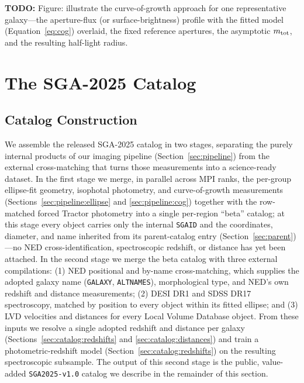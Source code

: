 \documentclass[modern,linenumbers]{aastex701}
\newcommand{\todo}[1]{{\color{red}\textbf{TODO:} #1}}
\begin{document}
\todo{Figure: illustrate the curve-of-growth approach for one
  representative galaxy---the aperture-flux (or surface-brightness)
  profile with the fitted model (Equation~\ref{eq:cog}) overlaid, the
  fixed reference apertures, the asymptotic $m_{\rm tot}$, and the
  resulting half-light radius.}

\section{The SGA-2025 Catalog}
\label{sec:catalog}

\subsection{Catalog Construction}
\label{sec:catalog:construction}

We assemble the released SGA-2025 catalog in two stages, separating the
purely internal products of our imaging pipeline (Section~\ref{sec:pipeline})
from the external cross-matching that turns those measurements into a
science-ready dataset. In the first stage we merge, in parallel across MPI
ranks, the per-group ellipse-fit geometry, isophotal photometry, and
curve-of-growth measurements (Sections~\ref{sec:pipeline:ellipse} and
\ref{sec:pipeline:cog}) together with the row-matched forced Tractor
photometry into a single per-region ``beta'' catalog; at this stage every
object carries only the internal \texttt{SGAID} and the coordinates,
diameter, and name inherited from its parent-catalog entry
(Section~\ref{sec:parent})---no NED cross-identification, spectroscopic
redshift, or distance has yet been attached. In the second stage we merge
the beta catalog with three external compilations: (1) NED positional and
by-name cross-matching, which supplies the adopted galaxy name
(\texttt{GALAXY}, \texttt{ALTNAMES}), morphological type, and NED's own
redshift and distance measurements; (2) DESI DR1 and SDSS DR17
spectroscopy, matched by position to every object within its fitted
ellipse; and (3) LVD velocities and distances for every Local Volume
Database object. From these inputs we resolve a single adopted redshift
and distance per galaxy (Sections~\ref{sec:catalog:redshifts} and
\ref{sec:catalog:distances}) and train a photometric-redshift model
(Section~\ref{sec:catalog:redshifts}) on the resulting spectroscopic
subsample. The output of this second stage is the public, value-added
\texttt{SGA2025-v1.0} catalog we describe in the remainder of this section.
\end{document}
